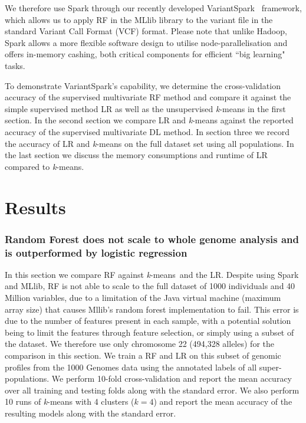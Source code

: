 \documentclass{llncs}
\newcommand{\variantSpark}{{\sc VariantSpark}}
\newcommand{\kMeans}{\textit{k}-means}
\begin{document}
{We therefore use {\sc Spark} through our recently developed \variantSpark~\cite{OBrien} framework, which allows us to
apply RF in the {\sc MLlib} library to the variant file in the standard Variant Call Format (VCF) format.  Please note
that unlike {\sc Hadoop}, {\sc Spark} allows a more flexible software design to utilise node-parallelisation and offers
in-memory cashing, both critical components for efficient ``big learning" tasks.

To demonstrate \variantSpark's capability, we determine the cross-validation accuracy of the supervised multivariate RF
method and compare it against the simple supervised method LR as well as the unsupervised \kMeans{} in the first
section.  In the second section we compare LR and \kMeans{} against the reported accuracy of the supervised multivariate
DL method.  In section three we record the accuracy of LR and \kMeans{} on the full dataset set using all populations.
In the last section we discuss the memory consumptions and runtime of LR compared to \kMeans{}.


\section{Results}

\subsubsection{Random Forest does not scale to whole genome analysis and is outperformed by logistic regression}
In this section we compare RF against \kMeans\ and the LR.  
Despite using {\sc Spark} and {\sc MLlib}, RF is not able to scale to the full dataset of 1000 individuals and 40
Million variables, due to a limitation of the Java virtual machine (maximum array size) that causes {\sc Mllib}'s
random forest implementation to fail. This error is due to the number of features present in each sample,
with a potential solution being to limit the features through feature selection, or simply using a subset of the dataset.
We therefore use only chromosome 22 (494,328 alleles) for the comparison in this section.  We train a RF
and LR on this subset of genomic profiles from the 1000 Genomes data using the annotated labels of all
super-populations.  We perform 10-fold cross-validation and report the mean accuracy over all training and testing folds
along with the standard error.  We also perform 10 runs of \kMeans{} with 4 clusters (\(k=4\)) and report the mean accuracy of the
resulting models along with the standard error.

}
\end{document}
